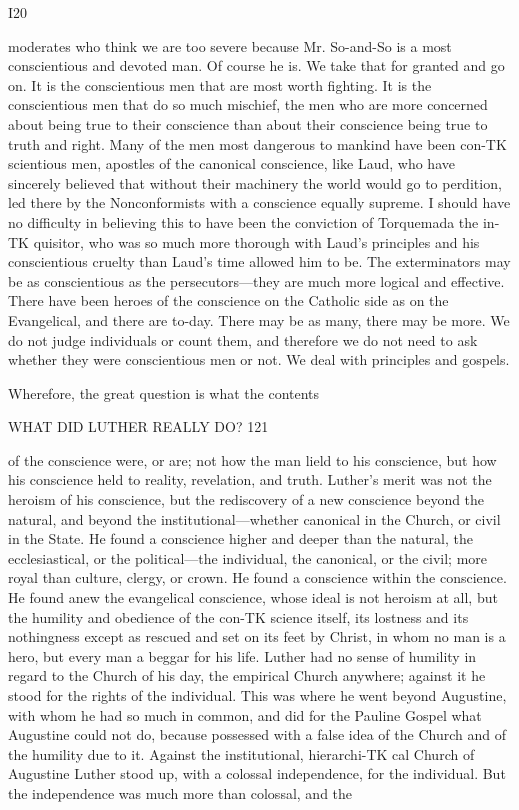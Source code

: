 \documentclass[12pt,a5paper,twoside]{book}
\begin{document}
I20 

moderates who think we are too severe because Mr. 
So-and-So is a most conscientious and devoted man. 
Of course he is. We take that for granted and go 
on. It is the conscientious men that are most worth 
fighting. It is the conscientious men that do so 
much mischief, the men who are more concerned 
about being true to their conscience than about their 
conscience being true to truth and right. Many of 
the men most dangerous to mankind have been con-TK
scientious men, apostles of the canonical conscience, 
like Laud, who have sincerely believed that without 
their machinery the world would go to perdition, 
led there by the Nonconformists with a conscience 
equally supreme. I should have no difficulty in believing 
this to have been the conviction of Torquemada the in-TK
quisitor, who was so much more thorough with Laud's 
principles and his conscientious cruelty than Laud's 
time allowed him to be. The exterminators may be as 
conscientious as the persecutors---they are much more 
logical and effective. There have been heroes of the 
conscience on the Catholic side as on the Evangelical, 
and there are to-day. There may be as many, there may 
be more. We do not judge individuals or count them, 
and therefore we do not need to ask whether they were 
conscientious men or not. We deal with principles 
and gospels. 

Wherefore, the great question is what the contents 



WHAT DID LUTHER REALLY DO? 121 

of the conscience were, or are; not how the man 
lield to his conscience, but how his conscience held to 
reality, revelation, and truth. Luther's merit was not 
the heroism of his conscience, but the rediscovery of 
a new conscience beyond the natural, and beyond the 
institutional---whether canonical in the Church, or civil 
in the State. He found a conscience higher and 
deeper than the natural, the ecclesiastical, or the 
political---the individual, the canonical, or the civil; 
more royal than culture, clergy, or crown. He found 
a conscience within the conscience. He found anew 
the evangelical conscience, whose ideal is not heroism 
at all, but the humility and obedience of the con-TK
science itself, its lostness and its nothingness except 
as rescued and set on its feet by Christ, in whom no 
man is a hero, but every man a beggar for his life. 
Luther had no sense of humility in regard to the 
Church of his day, the empirical Church anywhere; 
against it he stood for the rights of the individual. 
This was where he went beyond Augustine, with 
whom he had so much in common, and did for the 
Pauline Gospel what Augustine could not do, because 
possessed with a false idea of the Church and of the 
humility due to it. Against the institutional, hierarchi-TK
cal Church of Augustine Luther stood up, with a 
colossal independence, for the individual. But the 
independence was much more than colossal, and the 
\end{document}
